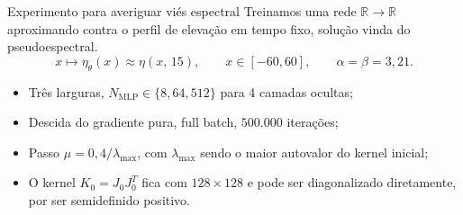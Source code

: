 \begin{frame}{Experimento para averiguar viés espectral}
  Treinamos uma rede $\mathbb{R} \to \mathbb{R}$ aproximando contra
  o perfil de elevação em tempo fixo, solução vinda do pseudoespectral.
  \begin{equation*}
    x \longmapsto \eta_\theta(x) \approx \eta(x,\, 15),
    \qquad x \in [-60, 60], \qquad \alpha = \beta = 3{,}21 .
  \end{equation*}
  \begin{itemize}[<+->]
    \item Três larguras, $N_{\mathrm{MLP}} \in \{8, 64, 512\}$ para 4 camadas ocultas;
    \item Descida do gradiente pura, full batch, $500.000$ iterações;
    \item Passo $\mu = 0{,}4/\lambda_{\max}$, com $\lambda_{\max}$ sendo o maior autovalor do kernel inicial;
    \item O kernel $K_0 = J_0 J_0^{T}$ fica com $128 \times 128$ e
          pode ser diagonalizado diretamente, por ser semidefinido positivo.
  \end{itemize}
\end{frame}


